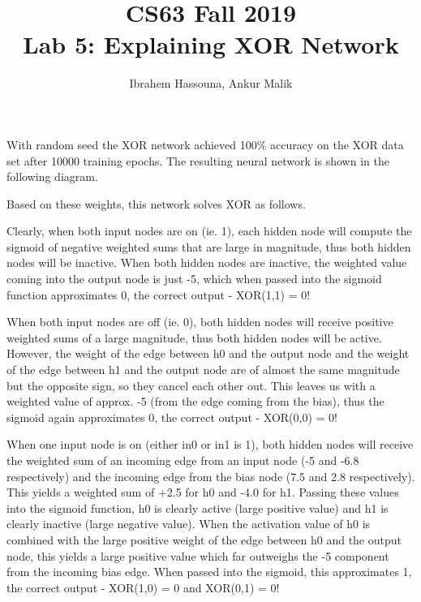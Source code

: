 \documentclass[11pt]{article}
\title{CS63 Fall 2019\\Lab 5: Explaining XOR Network}
\author{Ibrahem Hassouna, Ankur Malik}
\begin{document}
\maketitle

With random seed
the XOR network achieved 100\% accuracy on the XOR data set after 10000
training epochs.  The resulting neural network is shown in the
following diagram.

\begin{center}
\end{center}

Based on these weights, this network solves XOR as follows.

Clearly, when both input nodes are on (ie. 1), each hidden node will compute the
sigmoid of negative weighted sums that are large in magnitude, thus both hidden nodes will be inactive.
When both hidden nodes are inactive, the weighted value coming into the output node is just -5, which when
passed into the sigmoid function approximates 0, the correct output - XOR(1,1) = 0!

When both input nodes are off (ie. 0), both hidden nodes will receive positive weighted sums of a large magnitude,
thus both hidden nodes will be active. However, the weight of the edge between h0 and the output node and
the weight of the edge between h1 and the output node are of almost the same magnitude but the opposite sign,
so they cancel each other out. This leaves us with a weighted value of approx. -5 (from the edge coming from the bias),
thus the sigmoid again approximates 0, the correct output - XOR(0,0) = 0!

When one input node is on (either in0 or in1 is 1), both hidden nodes will receive the weighted sum of
an incoming edge from an input node (-5 and -6.8 respectively) and the incoming edge from the bias
node (7.5 and 2.8 respectively). This yields a weighted sum of +2.5 for h0 and -4.0 for h1. Passing these
values into the sigmoid function, h0 is clearly active (large positive value) and h1 is clearly inactive
(large negative value). When the activation value of h0 is combined with the large positive weight of the edge between h0
and the output node, this yields a large positive value which far outweighs the -5 component from the
incoming bias edge. When passed into the sigmoid, this approximates 1, the correct output - XOR(1,0) = 0 and XOR(0,1) = 0!
\end{document}
